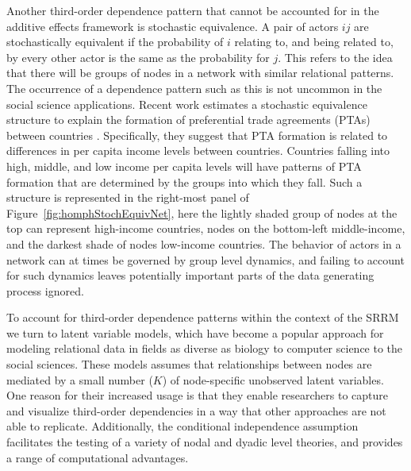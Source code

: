 \documentclass[9pt,twocolumn,twoside,lineno]{pnas-new}
\begin{document}
Another third-order dependence pattern that cannot be accounted for in the additive effects framework is stochastic equivalence. A pair of actors $ij$ are stochastically equivalent if the probability of $i$ relating to, and being related to, by every other actor is the same as the probability for $j$. This refers to the idea that there will be groups of nodes in a network with similar relational patterns. The occurrence of a dependence pattern such as this is not uncommon in the social science applications. Recent work estimates a stochastic equivalence structure to explain the formation of preferential trade agreements (PTAs) between countries \cite{manger:etal:2012}. Specifically, they suggest that PTA formation is related to differences in per capita income levels between countries. Countries falling into high, middle, and low income per capita levels will have patterns of PTA formation that are determined by the groups into which they fall. Such a structure is represented in the right-most panel of Figure~\ref{fig:homphStochEquivNet}, here the lightly shaded group of nodes at the top can represent high-income countries, nodes on the bottom-left middle-income, and the darkest shade of nodes low-income countries. The behavior of actors in a network can at times be governed by group level dynamics, and failing to account for such dynamics leaves potentially important parts of the data generating process ignored.

To account for third-order dependence patterns within the context of the SRRM we turn to latent variable models, which have become a popular approach for modeling relational data in fields as diverse as biology to computer science to the social sciences. These models assumes that relationships between nodes are mediated by a small number ($K$) of node-specific unobserved latent variables. One reason for their increased usage is that they enable researchers to capture and visualize third-order dependencies in a way that other approaches are not able to replicate. Additionally, the conditional independence assumption facilitates the testing of a variety of nodal and dyadic level theories, and provides a range of computational advantages.
\end{document}
